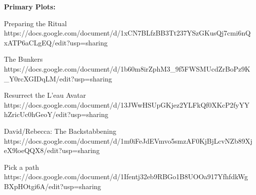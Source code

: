 \documentclass[char]{GL2020}
\begin{document}
\name{\cInitiate{}}








\textbf{Primary Plots:}

Preparing the Ritual https://docs.google.com/document/d/1xCN7BLfzBB3Tt237YSzGKusQj7cmi6nQxATP6aCLgEQ/edit?usp=sharing

The Bunkers https://docs.google.com/document/d/1b60m8irZphM3_9f5FWSMUcdZrBoPz9K_Y0rcXGIDqLM/edit?usp=sharing

Resurrect the L'eau Avatar https://docs.google.com/document/d/13JWwHSUpGKjez2YLFkQf0XKcP2fyYYhZricUc0hGeoY/edit?usp=sharing

David/Rebecca: The Backstabbening https://docs.google.com/document/d/1m0iFeJdEVmvo5smzAF0KjBjLcvNZb89XjeX9loeQQX8/edit?usp=sharing

Pick a path  https://docs.google.com/document/d/1Ifentj32eb9RBGo1B8UOOa917YfhfdkWgBXpHOtgi6A/edit?usp=sharing
\end{document}
